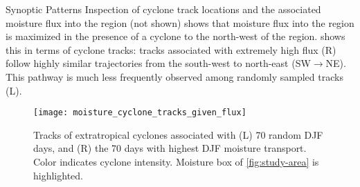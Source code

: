 \begin{block}{Synoptic Patterns}
    Inspection of cyclone track locations and the associated moisture flux into the region (not shown) shows that moisture flux into the region is maximized in the presence of a cyclone to the north-west of the region.
     shows this in terms of cyclone tracks: tracks associated with extremely high flux (R) follow highly similar trajectories from the south-west to north-east (SW$\rightarrow$NE).
    This pathway is much less frequently observed among randomly sampled tracks (L).
    \begin{figure}
        \texttt{[image: moisture\_cyclone\_tracks\_given\_flux]}
        \caption{Tracks of extratropical cyclones associated with (L) 70 random DJF days, and (R) the 70 days with highest DJF moisture transport. Color indicates cyclone intensity. Moisture box of \cref{fig:study-area} is highlighted.}
        \label{fig:track-given-flux}
    \end{figure}
\end{block}
